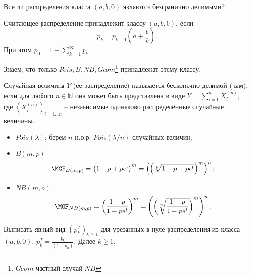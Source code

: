     \problem{}
        Все ли распределения класса $(a, b, 0)$ являются безгранично делимыми?
    \solution{}
        \begin{definition}
            Считающее распределение принадлежит классу $(a, b, 0)$, если 
            \begin{equation*}
                p_k = p_{k-1}\left( a+\frac{b}{k} \right).
            \end{equation*}
            При этом $p_0 = 1-\sum_{k = 1}^\infty p_k$
        \end{definition}
        Знаем, что только $Pois, B, NB, Geom$\footnote{$Geom$ частный случай $NB$} принадлежат этому классу.
        \begin{definition}
            Случайная  величина $Y$ (ее распределение) называется бесконечно делимой (-ым), если для любого $n \in \mathbb{N}$ она может быть представлена в виде $Y = \sum_{i=1}^n X^{(n)}_i$, где  $(X_i^{(n)})_{i=1\dots n}$ -- независимые одинаково распределённые случайные величины.
        \end{definition}
        \begin{itemize}
            \item $Pois(\lambda)$: берем $n$ н.о.р. $Pois(\lambda/n)$ случайных величин;
            \item $B(m, p)$ \begin{equation*}
                \MGF_{B(m, p)} = \left(1-p + pe^t\right)^m = \left(\left(\sqrt[n]{1-p + pe^t}\right)^m\right)^n;
            \end{equation*}
            \item $NB(m, p)$ \begin{equation*}
                \MGF_{NB(m, p)} = \left(\frac{1-p}{1-pe^t}\right)^m = \left(\left(\sqrt[n]{\frac{1-p}{1-pe^t}}\right)^m\right)^n.
            \end{equation*}
        \end{itemize}
    \problem{}
        Выписать явный вид $(p^T_k)_{k\geq 1}$ для урезанных в нуле распределения из класса $(a, b, 0)$.
    \solution{}
        $p^T_k = \frac{p_k}{(1 -p_0)}$. Далее $k\geq 1$.
